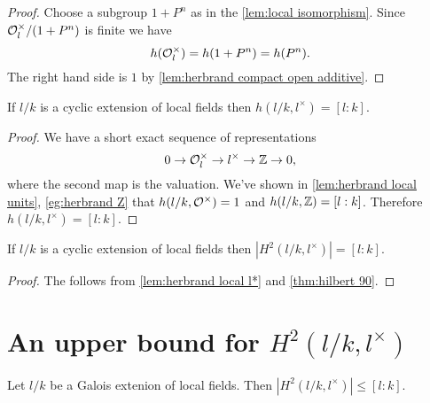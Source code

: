 \begin{proof}
	Choose a subgroup $1+P^n$ as in the \ref{lem:local isomorphism}.
	Since ${\mathcal O}_l^\times / (1+P^n)$ is finite we have
	\[
		h({\mathcal O}_l^\times) = h(1+P^n) = h(P^n).
	\]
	The right hand side is $1$ by \ref{lem:herbrand compact open additive}.
\end{proof}

\begin{lemma} \label{lem:herbrand local l*}
	If $l/k$ is a cyclic extension of local fields then $h(l/k, l^\times)= [l:k]$.
\end{lemma}

\begin{proof}
	We have a short exact sequence of representations
	\[
		0 \to {\mathcal O}_l^\times \to l^\times \to {\mathbb Z} \to 0,
 	\]
	where the second map is the valuation.
	We've shown in \ref{lem:herbrand local units}, \ref{eg:herbrand Z}
	that $h(l/k,{\mathcal O}^\times)=1$ and $h(l/k,{\mathbb Z}) = [l:k]$.
	Therefore $h(l/k,l^\times) = [l:k]$.
\end{proof}


\begin{lemma} \label{lem:local H2 l*}
	If $l/k$ is a cyclic extension of local fields then $|H^2(l/k,l^\times)| = [l:k]$.
\end{lemma}

\begin{proof}
	The follows from \ref{lem:herbrand local l*} and \ref{thm:hilbert 90}.
\end{proof}


\section{An upper bound for \texorpdfstring{$H^2(l/k,l^\times)$}{$H^2(l/k,l*)$}}

\begin{theorem} \label{lem:local H2 upper bound}
	Let $l/k$ be a Galois extenion of local fields.
	Then $|H^2(l/k,l^\times)| \le [l:k]$.
\end{theorem}

